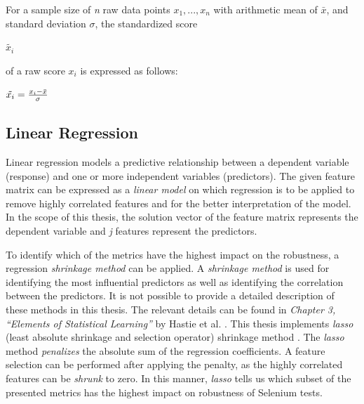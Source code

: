 \theoremstyle{definition}
\begin{definition}{For a sample size of \textit{n} raw data points \textit{$x_1,...,x_n$} with arithmetic mean of $\bar{x}$, and standard deviation $\sigma$, the standardized score\begin{large}
$\tilde{x_{i}}$
\end{large} of a raw score \textit{$x_{i}$} is expressed as follows: }
\begin{center}\Large
$\begin{tiny}
\tilde{x_{i}}
\end{tiny} = {x_{i}- \bar{x} \over \sigma}$
\label{def:standardization}
\end{center}
\end{definition}

\subsection{Linear Regression}
\label{regression}

Linear regression models a predictive relationship between a dependent variable (response) and one or more independent variables (predictors). The given feature matrix can be expressed as a \textit{linear model} on which regression is to be applied to remove highly correlated features and for the better interpretation of the model. In the scope of this thesis, the solution vector of the feature matrix represents the dependent variable and \textit{j} features represent the predictors. 

To identify which of the metrics have the highest impact on the robustness, a regression \textit{shrinkage method} can be applied. A \textit{shrinkage method} is used for identifying the most influential predictors as well as identifying the correlation between the predictors. It is not possible to provide a detailed description of these methods in this thesis. The relevant details can be found in \textit{Chapter 3, ``Elements of Statistical Learning''} by Hastie et al. \cite{hastie01statisticallearning}. This thesis implements \textit{lasso} (least absolute shrinkage and selection operator) shrinkage method \cite{tibshirani1996regression}. The  \textit{lasso} method \textit{penalizes} the absolute sum of the regression coefficients. A feature selection can be performed after applying the penalty, as the highly correlated features can be \textit{shrunk} to zero. 
In this manner, \textit{lasso} tells us which subset of the presented metrics has the highest impact on robustness of Selenium tests.

